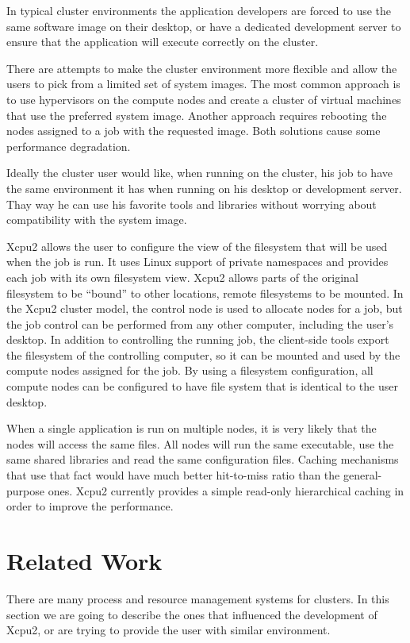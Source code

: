 \documentclass[10pt,conference,letterpaper]{IEEEtran}
\begin{document}
In typical cluster environments the application developers are forced to use
the same software image on their desktop, or have a dedicated development
server to ensure that the application will execute correctly on the cluster.

There are attempts to make the cluster environment more flexible and allow
the users to pick from a limited set of system images. The most common
approach is to use hypervisors on the compute nodes and create a cluster of
virtual machines that use the preferred system image. Another approach
requires rebooting the nodes assigned to a job with the requested image.
Both solutions cause some performance degradation.

Ideally the cluster user would like, when running on the cluster, his job to
have the same environment it has when running on his desktop or development
server. Thay way he can use his favorite tools and libraries without
worrying about compatibility with the system image.

Xcpu2 allows the user to configure the view of the filesystem that will be
used when the job is run. It uses Linux support of private namespaces and
provides each job with its own filesystem view. Xcpu2 allows parts of the
original filesystem to be ``bound'' to other locations, remote filesystems
to be mounted. In the Xcpu2 cluster model, the control node is used to
allocate nodes for a job, but the job control can be performed from any
other computer, including the user's desktop. In addition to controlling the
running job, the client-side tools export the filesystem of the controlling
computer, so it can be mounted and used by the compute nodes assigned for
the job. By using a filesystem configuration, all compute nodes can be
configured to have file system that is identical to the user desktop.

When a single application is run on multiple nodes, it is very likely that
the nodes will access the same files. All nodes will run the same
executable, use the same shared libraries and read the same configuration
files. Caching mechanisms that use that fact would have much better
hit-to-miss ratio than the general-purpose ones. Xcpu2 currently provides a
simple read-only hierarchical caching in order to improve the performance.

\section{Related Work}

There are many process and resource management systems for clusters. In this
section we are going to describe the ones that influenced the development of
Xcpu2, or are trying to provide the user with similar environment.
\end{document}
